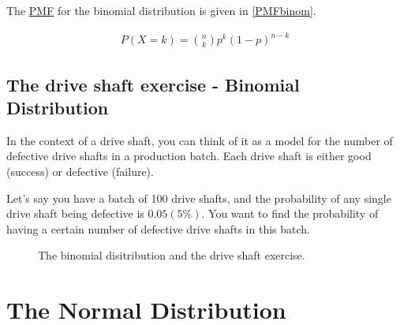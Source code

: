 \documentclass[
  a4paper,
]{scrbook}
\begin{document}
The \hyperref[acronyms_PMF]{PMF} for the binomial distribution is given
in \eqref{PMFbinom}.

\begin{align}
P(X = k) = \binom{n}{k} p^k (1 - p)^{n - k} \label{PMFbinom}
\end{align}

\subsection{The drive shaft exercise - Binomial
Distribution}\label{the-drive-shaft-exercise---binomial-distribution}

In the context of a drive shaft, you can think of it as a model for the
number of defective drive shafts in a production batch. Each drive shaft
is either good (success) or defective (failure).

Let's say you have a batch of 100 drive shafts, and the probability of
any single drive shaft being defective is \(0.05 (5\%)\). You want to
find the probability of having a certain number of defective drive
shafts in this batch.

\begin{figure}[ht]


\caption{\label{fig-bn-ds}The binomial disitribution and the drive shaft
exercise.}

\end{figure}%

\section{The Normal Distribution}\label{the-normal-distribution}
\end{document}
